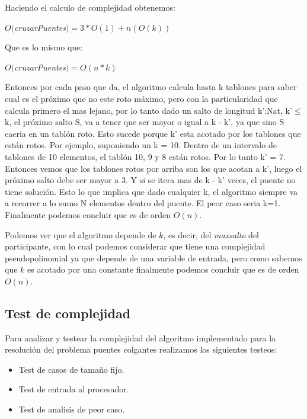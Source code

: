Haciendo el calculo de complejidad obtenemos:

$O($\textit{cruzarPuentes}$) = 3*O(1) + n(O(k))$

Que es lo mismo que:

$O($\textit{cruzarPuentes}$) = O(n*k)$


\label{an}
Entonces por cada paso que da, el algoritmo calcula hasta k tablones para saber cual es el pr\'oximo que no este roto m\'aximo, pero con la particularidad que calcula primero el mas lejano, por lo tanto dado un salto de longitud k':Nat, k'$\leq$ k, el pr\'oximo salto S, va a tener que ser mayor o igual a k - k', ya que sino S caeria en un tabl\'on roto.
Esto sucede porque k' esta acotado por los tablones que est\'an rotos.
Por ejemplo, suponiendo un k = 10. Dentro de un intervalo de tablones de 10 elementos, el tabl\'on 10, 9 y 8 est\'an rotos. Por lo tanto k' = 7. Entonces vemos que los tablones rotos por arriba son los que acotan a k', luego el pr\'oximo salto debe ser mayor a 3. Y si se itera mas de k - k' veces, el puente no tiene soluci\'on.
Esto lo que implica que dado cualquier k, el algoritmo siempre va a recorrer a lo sumo N elementos dentro del puente. El peor caso seria k=1.
Finalmente podemos concluir que es de orden $O(n)$.


Podemos ver que el algoritmo depende de $k$, es decir, del \textit{maxsalto} del participante, con lo cual podemos considerar que tiene una complejidad pseudopolinomial ya que depende de una variable de entrada, pero como sabemos que $k$ es acotado por una constante finalmente podemos concluir que es de orden $O(n)$.

\subsection{Test de complejidad}

Para analizar y testear la complejidad del algoritmo implementado para la resoluci\'on del problema puentes colgantes realizamos los siguientes testeos:

\begin{itemize}
  \item Test de casos de tamaño fijo.
  \item Test de entrada al procesador.
  \item Test de analisis de peor caso.
\end{itemize}

